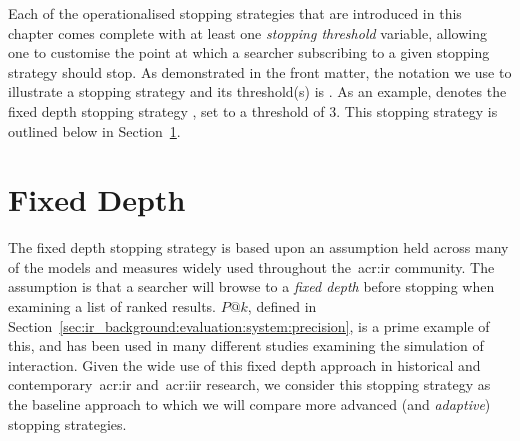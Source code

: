 %

Each of the operationalised stopping strategies that are introduced in this chapter comes complete with at least one \emph{stopping threshold} variable, allowing one to customise the point at which a searcher subscribing to a given stopping strategy should stop. As demonstrated in the  front matter, the notation we use to illustrate a stopping strategy and its threshold(s) is . As an example,  denotes the fixed depth stopping strategy , set to a threshold of $3$. This stopping strategy is outlined below in Section~\ref{sec:strategies:fixed}.

\section{Fixed Depth}\label{sec:strategies:fixed}
The fixed depth stopping strategy is based upon an assumption held across many of the models and measures widely used throughout the~\gls{acr:ir} community. The assumption is that a searcher will browse to a \emph{fixed depth} before stopping when examining a list of ranked results. $P@k$, defined in Section~\ref{sec:ir_background:evaluation:system:precision}, is a prime example of this, and has been used in many different studies examining the simulation of interaction. Given the wide use of this fixed depth approach in historical and contemporary~\gls{acr:ir} and~\gls{acr:iir} research, we consider this stopping strategy as the baseline approach to which we will compare more advanced (and \emph{adaptive}) stopping strategies.


